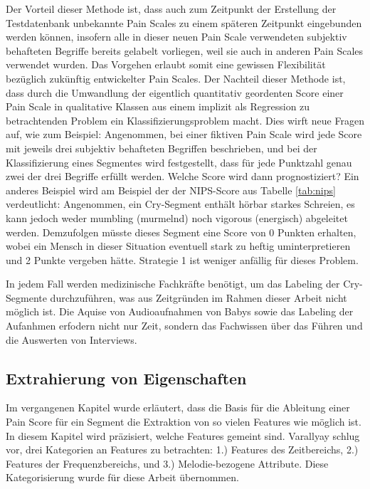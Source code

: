 Der Vorteil dieser Methode ist, dass auch zum Zeitpunkt der Erstellung der Testdatenbank unbekannte Pain Scales zu einem späteren Zeitpunkt eingebunden werden können, insofern alle in dieser neuen Pain Scale verwendeten subjektiv behafteten Begriffe bereits gelabelt vorliegen, weil sie auch in anderen Pain Scales verwendet wurden. Das Vorgehen erlaubt somit eine gewissen Flexibilität bezüglich zukünftig entwickelter Pain Scales. Der Nachteil dieser Methode ist, dass durch die Umwandlung der eigentlich quantitativ geordenten Score einer Pain Scale in qualitative Klassen aus einem implizit als Regression zu betrachtenden Problem ein Klassifizierungsproblem macht. Dies wirft neue Fragen auf, wie zum Beispiel: Angenommen, bei einer fiktiven Pain Scale wird jede Score mit jeweils drei subjektiv behafteten Begriffen beschrieben, und bei der Klassifizierung eines Segmentes wird festgestellt, dass für jede Punktzahl genau zwei der drei Begriffe erfüllt werden. Welche Score wird dann prognostiziert? Ein anderes Beispiel wird am Beispiel der der NIPS-Score aus Tabelle \ref{tab:nips} verdeutlicht: Angenommen, ein Cry-Segment enthält hörbar \glqq starkes\grqq{} Schreien, es kann jedoch weder \glqq mumbling (murmelnd) \grqq{} noch \glqq vigorous (energisch)\grqq{} abgeleitet werden. Demzufolgen müsste dieses Segment eine Score von 0 Punkten erhalten, wobei ein Mensch in dieser Situation eventuell \glqq stark\grqq{} zu \glqq heftig\grqq{} uminterpretieren und 2 Punkte vergeben hätte. Strategie 1 ist weniger anfällig für dieses Problem.

In jedem Fall werden medizinische Fachkräfte benötigt, um das Labeling der Cry-Segmente durchzuführen, was aus Zeitgründen im Rahmen dieser Arbeit nicht möglich ist. Die Aquise von Audioaufnahmen von Babys sowie das Labeling der Aufanhmen erfodern nicht nur Zeit, sondern das Fachwissen über das Führen und die Auswerten von Interviews.

\subsection{Extrahierung von Eigenschaften}
\label{sec:segmentFeatures}

Im vergangenen Kapitel wurde erläutert, dass die Basis für die Ableitung einer Pain Score für ein Segment die Extraktion von \glqq so vielen Features wie möglich\grqq{} ist. In diesem Kapitel wird präzisiert, welche Features gemeint sind.  Varallyay \cite[S. 16 - 17]{cry_thesis} schlug vor, drei Kategorien an Features zu betrachten: 1.) Features des Zeitbereichs, 2.) Features der Frequenzbereichs, und 3.) Melodie-bezogene Attribute. Diese Kategorisierung wurde für diese Arbeit übernommen.

